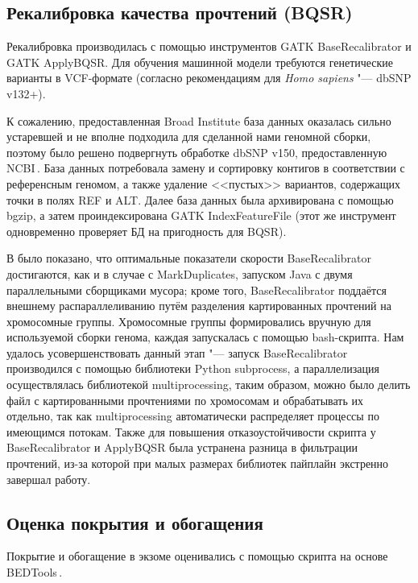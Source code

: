 \documentclass[12pt, twoside, a4paper]{article}
\newcommand{\utilname}[1]{\textenglish{#1}}
\begin{document}
\subsection{Рекалибровка качества прочтений (BQSR)}
Рекалибровка производилась с помощью инструментов \utilname{GATK BaseRecalibrator} и \utilname{GATK ApplyBQSR}.
Для обучения машинной модели требуются генетические варианты в VCF-формате (согласно рекомендациям для \textit{Homo sapiens} "--- dbSNP v132+).

К сожалению, предоставленная Broad Institute база данных оказалась сильно устаревшей и не вполне подходила для сделанной нами геномной сборки, поэтому было решено подвергнуть обработке dbSNP v150, предоставленную NCBI\,\cite{Sherry_2001}.
База данных потребовала замену и сортировку контигов в соответствии с референсным геномом, а также удаление <<пустых>> вариантов, содержащих точки в полях REF и ALT.
Далее база данных была архивирована с помощью \utilname{bgzip}, а затем проиндексирована \utilname{GATK IndexFeatureFile} (этот же инструмент одновременно проверяет БД на пригодность для BQSR).

В \cite{Heldenbrand_2019} было показано, что оптимальные показатели скорости \utilname{BaseRecalibrator} достигаются, как и в случае с \utilname{MarkDuplicates}, запуском \utilname{Java} с двумя параллельными сборщиками мусора;
кроме того, \utilname{BaseRecalibrator} поддаётся внешнему распараллеливанию путём разделения картированных прочтений на хромосомные группы.
Хромосомные группы формировались вручную для используемой сборки генома, каждая запускалась с помощью \utilname{bash}-скрипта.
Нам удалось усовершенствовать данный этап "--- запуск \utilname{BaseRecalibrator} производился с помощью библиотеки \utilname{Python} \utilname{subprocess}, а параллелизация осуществлялась библиотекой \utilname{multiprocessing}, таким образом, можно было делить файл с картированными прочтениями по хромосомам и обрабатывать их отдельно, так как \utilname{multiprocessing} автоматически распределяет процессы по имеющимся потокам.
Также для повышения отказоустойчивости скрипта у \utilname{BaseRecalibrator} и \utilname{ApplyBQSR} была устранена разница в фильтрации прочтений, из-за которой при малых размерах библиотек пайплайн экстренно завершал работу.

\subsection{Оценка покрытия и обогащения}
Покрытие и обогащение в экзоме оценивались с помощью скрипта на основе \utilname{BEDTools}\,\cite{Quinlan_2010}.
\end{document}
